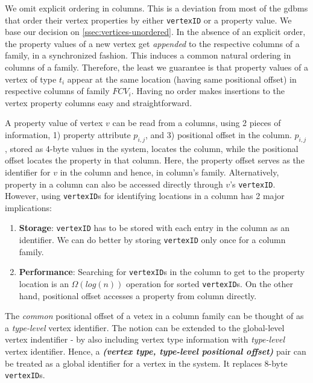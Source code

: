 We omit explicit ordering in columns. This is a deviation from most of the \gls{gdbms} that order their vertex properties by either \texttt{vertexID} or a property value.  We base our decision on \ref{ssec:vertices-unordered}. In the absence of an explicit order, the property values of a new vertex get \emph{appended} to the respective columns of a family, in a synchronized fashion. This induces a common natural ordering in columns of a family. Therefore, the least we guarantee is that property values of a vertex of type $t_i$ appear at the same location (having same positional offset) in respective columns of family $FCV_i$. Having no order makes insertions to the vertex property columns easy and straightforward.

A property value of vertex $v$ can be read from a columns, using 2 pieces of information, 1) property attribute $p_{i,j}$, and 3) positional offset in the column. $p_{i,j}$, stored as 4-byte values in the system, locates the column, while the positional offset locates the property in that column. Here, the property offset serves as the identifier for $v$ in the column and hence, in column's family. Alternatively, property in a column can also be accessed directly through $v$'s \texttt{vertexID}. However, using \texttt{vertexID}s for identifying locations in a column has 2 major implications:
\vspace{-6pt}
\begin{enumerate}
	\item \textbf{Storage}: \texttt{vertexID} has to be stored with each entry in the column as an identifier. We can do better by storing \texttt{vertexID} only once for a column family.
	\item \textbf{Performance}: Searching for \texttt{vertexID}s in the column to get to the property location is an $\Omega(log(n))$ operation for sorted \texttt{vertexID}s. On the other hand, positional offset accesses a property from column directly.
\end{enumerate}
\vspace{-6pt}
The \emph{common} positional offset of a vetex in a column family can be thought of as a \emph{type-level} vertex identifier. The notion can be extended to the global-level vertex indentifier - by also including vertex type information with \emph{type-level} vertex identifier. Hence, a \emph{\textbf{(vertex type, type-level positional offset)}} pair can be treated as a global identifier for a vertex in the system. It replaces 8-byte \texttt{vertexID}s. 

